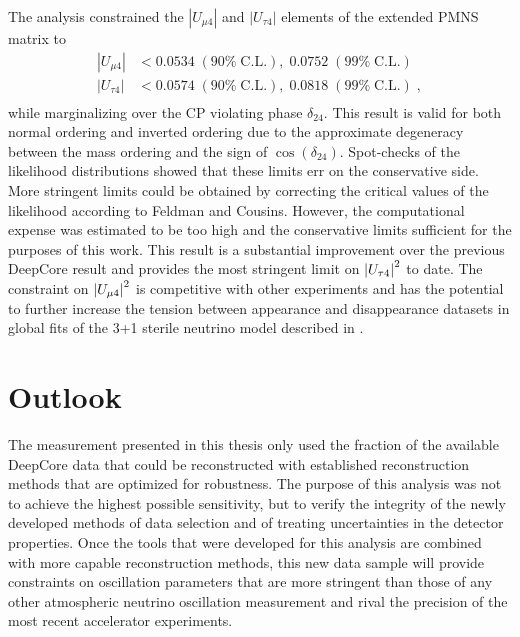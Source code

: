 The analysis constrained the $|U_{\mu4}|$ and $|U_{\tau4}|$ elements of the extended PMNS matrix to
\begin{equation}
\begin{aligned}
    |U_{\mu 4}| & < 0.0534\;(90\%\;\mathrm{C.L.}),\;0.0752\;(99\%\;\mathrm{C.L.})\\
    |U_{\tau 4}| & < 0.0574\;(90\%\;\mathrm{C.L.}),\;0.0818\;(99\%\;\mathrm{C.L.})\;,\\
\end{aligned}
\end{equation}
while marginalizing over the CP violating phase $\delta_{24}$. This result is valid for both normal ordering and inverted ordering due to the approximate degeneracy between the mass ordering and the sign of $\cos(\delta_{24})$. Spot-checks of the likelihood distributions showed that these limits err on the conservative side. More stringent limits could be obtained by correcting the critical values of the likelihood according to Feldman and Cousins\cite{Feldman_1998}. However, the computational expense was estimated to be too high and the conservative limits sufficient for the purposes of this work. This result is a substantial improvement over the previous DeepCore result and provides the most stringent limit on $\abs{U_{\tau4}}^2$ to date. The constraint on $\abs{U_{\mu4}}^2$ is competitive with other experiments and has the potential to further increase the tension between appearance and disappearance datasets in global fits of the 3+1 sterile neutrino model described in .

\section{Outlook}

The measurement presented in this thesis only used the fraction of the available DeepCore data that could be reconstructed with established reconstruction methods that are optimized for robustness.
The purpose of this analysis was not to achieve the highest possible sensitivity, but to verify the integrity of the newly developed methods of data selection and of treating uncertainties in the detector properties.
Once the tools that were developed for this analysis are combined with more capable reconstruction methods, this new data sample will provide constraints on oscillation parameters that are more stringent than those of any other atmospheric neutrino oscillation measurement and rival the precision of the most recent accelerator experiments.

